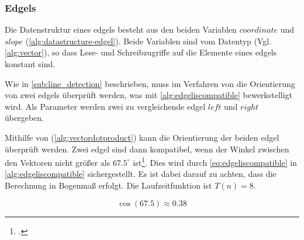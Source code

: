 \subsubsection{Edgels} %
\label{sub:datenstruktur-edgels}

Die Datenstruktur eines \glspl{edgel} besteht aus den beiden Variablen $\mathit{coordinate}$ und $\mathit{slope}$
 (\autoref{alg:datastructure-edgel}). Beide Variablen sind vom Datentyp  (Vgl.
 \autoref{alg:vector}), so dass Lese- und Schreibzugriffe auf die Elemente eines \glspl{edgel} konstant sind.


Wie in \autoref{sub:line_detection} beschrieben, muss im Verfahren von \citeauthor{hirzer08} die Orientierung von zwei
 \glspl{edgel} überprüft werden, was mit \autoref{alg:edgeliscompatible} bewerkstelligt wird. Als Parameter werden
 zwei zu vergleichende \gls{edgel} $\mathit{left}$ und $\mathit{right}$ übergeben.

Mithilfe von  (\autoref{alg:vectordotproduct}) kann die Orientierung der beiden \gls{edgel}
 überprüft werden. Zwei \gls{edgel} sind dann kompatibel, wenn der Winkel zwischen den Vektoren nicht größer als
 $67.5^\circ$ ist\footcite[Vgl.][S.~417]{clarke96}. Dies wird durch \autoref{eq:edgeliscompatible} in
 \autoref{alg:edgeliscompatible} sichergestellt. Es ist dabei darauf zu achten, dass die Berechnung in Bogenmaß
 erfolgt. Die Laufzeitfunktion ist $T(n) = 8$.

\begin{equation}
	\label{eq:edgeliscompatible}
	\cos \left(67.5\right) \approx 0.38
\end{equation}

